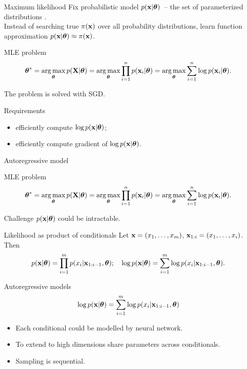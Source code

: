\begin{frame}{Maximum likelihood}
    Fix probabilistic model $p(\mathbf{x} | \boldsymbol{\theta})$~-- the set of parameterized distributions . \\
    Instead of searching true $\pi(\mathbf{x})$ over all probability distributions, learn function approximation $p(\mathbf{x} | \boldsymbol{\theta}) \approx \pi(\mathbf{x})$.
    
    \begin{block}{MLE problem}
    \vspace{-0.3cm}
    \[
        \boldsymbol{\theta}^* = \operatorname*{arg\,max}_{\boldsymbol{\theta}} p(\mathbf{X} | \boldsymbol{\theta}) = \operatorname*{arg\,max}_{\boldsymbol{\theta}} \prod_{i=1}^n p(\mathbf{x}_i | \boldsymbol{\theta}) = \operatorname*{arg\,max}_{\boldsymbol{\theta}} \sum_{i=1}^n \log p(\mathbf{x}_i | \boldsymbol{\theta}).
    \]
    \vspace{-0.1cm}
    \end{block}
    
    The problem is solved with SGD.
    \begin{block}{Requirements}
        \begin{itemize}
            \item efficiently compute $\log p(\mathbf{x} | \boldsymbol{\theta})$;
            \item efficiently compute gradient of $\log p(\mathbf{x} | \boldsymbol{\theta})$.
        \end{itemize}
    \end{block}
\end{frame}
\begin{frame}{Autoregressive model}
    \begin{block}{MLE problem}
    \vspace{-0.3cm}
    \[
        \boldsymbol{\theta}^* = \operatorname*{arg\,max}_{\boldsymbol{\theta}} p(\mathbf{X} | \boldsymbol{\theta}) = \operatorname*{arg\,max}_{\boldsymbol{\theta}} \prod_{i=1}^n p(\mathbf{x}_i | \boldsymbol{\theta}) = \operatorname*{arg\,max}_{\boldsymbol{\theta}} \sum_{i=1}^n \log p(\mathbf{x}_i | \boldsymbol{\theta}).
    \]
    \vspace{-0.1cm}
    \end{block}
    \begin{block}{Challenge}
    $p(\mathbf{x} | \boldsymbol{\theta})$ could be intractable.
    \end{block}
    \begin{block}{Likelihood as product of conditionals}
    Let $\mathbf{x} = (x_1, \dots, x_m)$, $\mathbf{x}_{1:i} = (x_1, \dots, x_i)$. Then 
    \[
        p(\mathbf{x} | \boldsymbol{\theta}) = \prod_{i=1}^m p(x_i | \mathbf{x}_{1:i - 1}, \boldsymbol{\theta}); \quad 
        \log p(\mathbf{x} | \boldsymbol{\theta}) = \sum_{i=1}^m \log p(x_i | \mathbf{x}_{1:i - 1}, \boldsymbol{\theta}).
    \]
    \end{block}
\end{frame}
\begin{frame}{Autoregressive models}
    \[
    \log p(\mathbf{x}| \boldsymbol{\theta}) = \sum_{i=1}^m \log p(x_i | \mathbf{x}_{1:i - 1}, \boldsymbol{\theta})
    \]
    \begin{itemize}
        \item Each conditional could be modelled by neural network.
        \item To extend to high dimensions share parameters across conditionals.
        \item Sampling is sequential.
    \end{itemize}
    
\end{frame}
